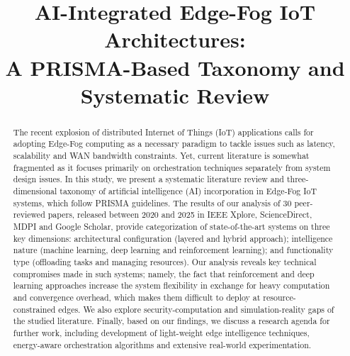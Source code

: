 \documentclass[conference]{IEEEtran}
\begin{document}
\title{AI-Integrated Edge-Fog IoT Architectures:\\ A PRISMA-Based Taxonomy and Systematic Review}

\author{
\and
{}
}

\maketitle

\begin{abstract}
The recent explosion of distributed Internet of Things (IoT) applications calls for adopting Edge-Fog computing as a necessary paradigm to tackle issues such as latency, scalability and WAN bandwidth constraints. Yet, current literature is somewhat fragmented as it focuses primarily on orchestration techniques separately from system design issues. In this study, we present a systematic literature review and three-dimensional taxonomy of artificial intelligence (AI) incorporation in Edge-Fog IoT systems, which follow PRISMA guidelines. The results of our analysis of 30 peer-reviewed papers, released between 2020 and 2025 in IEEE Xplore, ScienceDirect, MDPI and Google Scholar, provide categorization of state-of-the-art systems on three key dimensions: architectural configuration (layered and hybrid approach); intelligence nature (machine learning, deep learning and reinforcement learning); and functionality type (offloading tasks and managing resources). Our analysis reveals key technical compromises made in such systems; namely, the fact that reinforcement and deep learning approaches increase the system flexibility in exchange for heavy computation and convergence overhead, which makes them difficult to deploy at resource-constrained edges. We also explore security-computation and simulation-reality gaps of the studied literature. Finally, based on our findings, we discuss a research agenda for further work, including development of light-weight edge intelligence techniques, energy-aware orchestration algorithms and extensive real-world experimentation.

\end{abstract}
\end{document}
